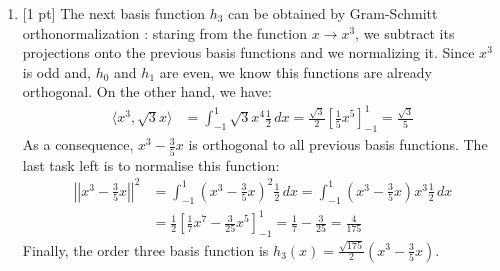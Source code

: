 \documentclass[a4paper,10pt]{article}
\begin{document}
\begin{enumerate}[label=Q\arabic*.]
\item {[1 pt]} The next basis function $h_3$ can be obtained by Gram-Schmitt orthonormalization : staring from the function $x \rightarrow x^3$, we subtract its projections onto the previous basis functions and we normalizing it. Since $x^3$ is odd and, $h_0$ and $h_1$ are even, we know this functions are already orthogonal. On the other hand, we have:
\begin{align*}
	\langle x^3, \sqrt{3} x \rangle &= \int_{-1}^1 \sqrt{3} x^4 \frac12 \, dx 
	 = \frac{\sqrt{3}}{2} \left[ \frac15 x^5 \right]_{-1}^1  
	 = \frac{\sqrt{3}}{5}  
\end{align*}
As a consequence, $x^3 - \frac35 x $ is orthogonal to all previous basis functions. The last task left is to normalise this function:
\begin{align*}
	\left| \left| x^3 - \frac35 x \right| \right|^2 
	&= \int_{-1}^1 \left(x^3 - \frac35 x\right)^2 \frac12 \, dx  
	= \int_{-1}^1 \left(x^3 - \frac35 x\right)x^3 \frac12 \, dx \\
	& = \frac{1}{2} \left[ \frac17 x^7 - \frac{3}{25} x^5\right]_{-1}^1  
	 = \frac{1}{7} - \frac{3}{25} = \frac{4}{175} 
\end{align*}
Finally, the order three basis function is $\displaystyle h_3(x) = \frac{\sqrt{175}}{2} \left(x^3 - \frac35 x\right).$


\end{enumerate}
\end{document}
